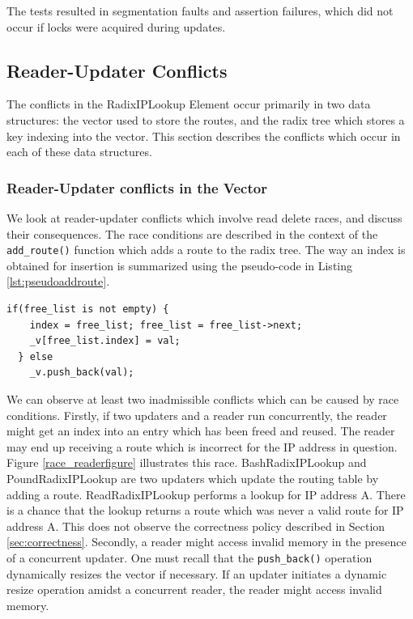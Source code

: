 \documentclass[a4paper]{article}
\begin{document}
The tests resulted in segmentation faults and assertion failures, which did not occur if locks were acquired during updates.
\subsection{Reader-Updater Conflicts}
The conflicts in the RadixIPLookup Element occur primarily in two data structures: the vector used to store the routes, and the radix tree which stores a key indexing into the vector. This section describes the conflicts which occur in each of these data structures.\\

\subsubsection{Reader-Updater conflicts in the Vector}
We look at reader-updater conflicts which involve read delete races, and discuss their consequences.
The race conditions are described in the context of the \verb+add_route()+ function which adds a route
to the radix tree. The way an index is obtained for insertion is
summarized using the pseudo-code in Listing \ref{lst:pseudoaddroute}.
\begin{lstlisting}[caption = Pseudo-code for acquiring an index in \texttt{add\_route()}, label=lst:pseudoaddroute]
  if(free_list is not empty) {
    index = free_list; free_list = free_list->next;
    _v[free_list.index] = val;
  } else
    _v.push_back(val);
\end{lstlisting}
We can observe at least two inadmissible conflicts which can be caused
by race conditions. Firstly, if two updaters and a reader run
concurrently, the reader might get an index into an entry which has
been freed and reused. The reader may end up receiving a route which
is incorrect for the IP address in question. Figure
\ref{race_readerfigure} illustrates this race. BashRadixIPLookup and
PoundRadixIPLookup are two updaters which update the routing table by
adding a route. ReadRadixIPLookup performs a lookup for IP address
A. There is a chance that the lookup returns a route which was never a
valid route for IP address A. This does not observe the correctness
policy described in Section \ref{sec:correctness}. Secondly, a reader
might access invalid memory in the presence of a concurrent
updater. One must recall that the \verb+push_back()+ operation
dynamically resizes the vector if necessary. If an updater initiates a
dynamic resize operation amidst a concurrent reader, the reader might
access invalid memory.
\end{document}
